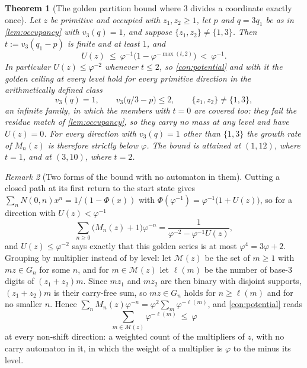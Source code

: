 \documentclass[11pt]{amsart}
\newtheorem{theorem}{Theorem}[section]
\theoremstyle{definition}
\theoremstyle{remark}
\newtheorem{remark}[theorem]{Remark}
\begin{document}
\begin{theorem}[The golden partition bound where $3$ divides a coordinate exactly once]
\label{thm:golden1}
Let $z$ be primitive and occupied with $z_1,z_2\ge 1$, let $p$ and $q=3q_1$ be as in \cref{lem:occupancy} with $v_3(q)=1$, and suppose $\{z_1,z_2\}\neq\{1,3\}$. Then $t:=v_3(q_1-p)$ is finite and at least $1$, and
\[
U(z)\ \le\ \varphi^{-1}\bigl(1-\varphi^{-\max(t,2)}\bigr)\ <\ \varphi^{-1} .
\]
In particular $U(z)\le\varphi^{-2}$ whenever $t\le 2$, so \cref{con:potential} and with it the golden ceiling at every level hold for every primitive direction in the arithmetically defined class
\[
v_3(q)=1,\qquad v_3\bigl(q/3-p\bigr)\le 2,\qquad \{z_1,z_2\}\neq\{1,3\} ,
\]
an infinite family, in which the members with $t=0$ are covered too: they fail the residue match of \cref{lem:occupancy}, so they carry no mass at any level and have $U(z)=0$. For every direction with $v_3(q)=1$ other than $\{1,3\}$ the growth rate of $M_n(z)$ is therefore strictly below $\varphi$. The bound is attained at $(1,12)$, where $t=1$, and at $(3,10)$, where $t=2$.
\end{theorem}

\begin{remark}[Two forms of the bound with no automaton in them]
\label{rem:reform}
Cutting a closed path at its first return to the start state gives $\sum_n N(0,n)x^n=1/(1-\Phi(x))$ with $\Phi(\varphi^{-1})=\varphi^{-1}\bigl(1+U(z)\bigr)$, so for a direction with $U(z)<\varphi^{-1}$
\[
\sum_{n\ge 0}\bigl(M_n(z)+1\bigr)\varphi^{-n}=\frac{1}{\varphi^{-2}-\varphi^{-1}U(z)} ,
\]
and $U(z)\le\varphi^{-2}$ says exactly that this golden series is at most $\varphi^{4}=3\varphi+2$. Grouping by multiplier instead of by level: let $\mathcal{M}(z)$ be the set of $m\ge 1$ with $mz\in G_n$ for some $n$, and for $m\in\mathcal{M}(z)$ let $\ell(m)$ be the number of base-$3$ digits of $(z_1+z_2)m$. Since $mz_1$ and $mz_2$ are then binary with disjoint supports, $(z_1+z_2)m$ is their carry-free sum, so $mz\in G_n$ holds for $n\ge\ell(m)$ and for no smaller $n$. Hence $\sum_nM_n(z)\varphi^{-n}=\varphi^2\sum_{m}\varphi^{-\ell(m)}$, and \cref{con:potential} reads
\[
\sum_{m\in\mathcal{M}(z)}\varphi^{-\ell(m)}\ \le\ \varphi
\]
at every non-shift direction: a weighted count of the multipliers of $z$, with no carry automaton in it, in which the weight of a multiplier is $\varphi$ to the minus its level.
\end{remark}
\end{document}
